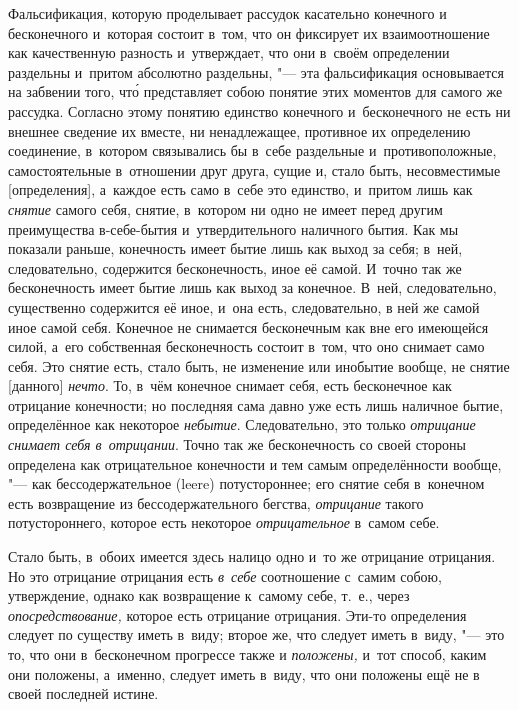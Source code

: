 Фальсификация, которую проделывает рассудок касательно конечного и
бесконечного и~которая состоит в~том, что он фиксирует их взаимоотношение
как качественную разность и~утверждает, что они в~своём определении
раздельны и~притом абсолютно раздельны, "--- эта фальсификация основывается на
забвении того, чт\'{о} представляет собою понятие этих моментов для самого же
рассудка. Согласно этому понятию единство конечного и~бесконечного не есть
ни внешнее сведение их вместе, ни ненадлежащее, противное их определению
соединение, в~котором связывались бы в~себе раздельные и~противоположные,
самостоятельные в~отношении друг друга, сущие и, стало быть, несовместимые
[определения], а~каждое есть само в~себе это единство, и~притом лишь как
{\em снятие} самого себя, снятие, в~котором ни одно не
имеет перед другим преимущества в-себе-бытия и~утвердительного наличного
бытия. Как мы показали раньше, конечность имеет бытие лишь как выход за
себя; в~ней, следовательно, содержится бесконечность, иное её самой.
И~точно так же бесконечность имеет бытие лишь как выход за конечное. В~ней,
следовательно, существенно содержится её иное, и~она есть, следовательно,
в ней же самой иное самой себя. Конечное не снимается бесконечным как вне
его имеющейся силой, а~его собственная бесконечность состоит в~том, что оно
снимает само себя. Это снятие есть, стало быть, не изменение или инобытие
вообще, не снятие [данного] {\em нечто}. То, в~чём
конечное снимает себя, есть бесконечное как отрицание конечности; но
последняя сама давно уже есть лишь наличное бытие, определённое как
некоторое {\em небытие}. Следовательно, это только
{\em отрицание снимает себя в~отрицании}. Точно так же
бесконечность со своей стороны определена как отрицательное конечности и
тем самым определённости вообще, "--- как бессодержательное (leere)
потустороннее; его снятие себя в~конечном есть возвращение из
бессодержательного бегства, {\em отрицание} такого
потустороннего, которое есть некоторое
{\em отрицательное} в~самом себе.

Стало быть, в~обоих имеется здесь налицо одно и~то же отрицание отрицания.
Но это отрицание отрицания есть {\em в~себе}
соотношение с~самим собою, утверждение, однако как возвращение к~самому
себе, т.~е., через {\em опосредствование,} которое есть
отрицание отрицания. Эти-то определения следует по существу иметь в~виду;
второе же, что следует иметь в~виду, "--- это то, что они в~бесконечном
прогрессе также и {\em положены,} и~тот способ, каким
они положены, а~именно, следует иметь в~виду, что они положены ещё не в
своей последней истине.

